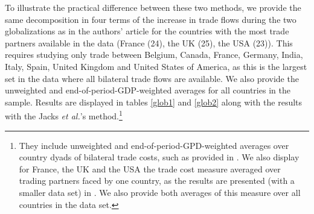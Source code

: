 \documentclass{article}
\begin{document}
To illustrate the practical difference between these two methods, we provide the same decomposition in four terms of the increase in trade flows during the two globalizations as in the authors' article for the countries with the most trade partners available in the data (France (24), the UK (25), the USA (23)).
This requires studying only trade between Belgium, Canada, France, Germany, India, Italy, Spain, United Kingdom and United States of America, as this is the largest set in the data where all bilateral trade flows are available. 
We also provide the unweighted and end-of-period-GDP-weighted averages for all countries in the sample. 
Results are displayed in tables \ref{glob1} and \ref{glob2} along with the results with the
Jacks \textit{et al.}'s method.\footnote{They include unweighted and
end-of-period-GPD-weighted averages over country dyads of
bilateral trade costs, such as provided in \cite{JMN2011}.
We also display for France, the UK and the USA the trade cost measure averaged over trading partners faced by one country, as the results are presented (with a smaller data set) in
\cite{JMN2008, JMN2010}.
We also provide both averages of this measure over all countries in the data set.}\\
\end{document}
